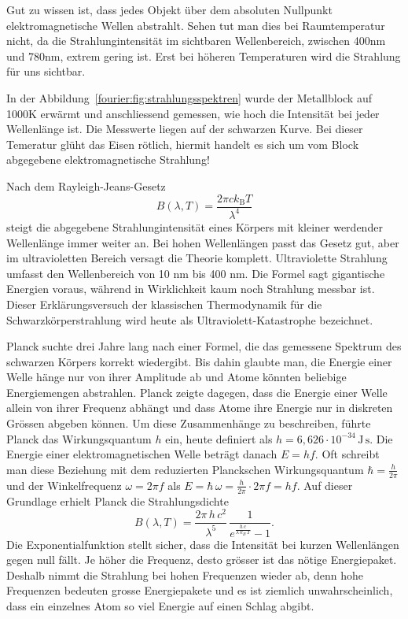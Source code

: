 Gut zu wissen ist, dass jedes Objekt über dem absoluten Nullpunkt elektromagnetische Wellen abstrahlt. 
Sehen tut man dies bei Raumtemperatur nicht, da die Strahlungintensität im sichtbaren Wellenbereich, zwischen 400nm und 780nm, extrem gering ist. 
Erst bei höheren Temperaturen wird die Strahlung für uns sichtbar. 



In der Abbildung~\ref{fourier:fig:strahlungsspektren} wurde der Metallblock auf 1000K erwärmt und anschliessend gemessen, wie hoch die Intensität bei jeder Wellenlänge ist. 
Die Messwerte liegen auf der schwarzen Kurve.
Bei dieser Temeratur glüht das Eisen rötlich, hiermit handelt es sich um vom Block abgegebene elektromagnetische Strahlung!


Nach dem Rayleigh-Jeans-Gesetz 
%
\begin{equation}
	B(\lambda, T) = \frac{2 \pi c k_\mathrm{B} T}{\lambda^4}
\end{equation}
steigt die abgegebene Strahlungintensität eines Körpers mit kleiner werdender Wellenlänge immer weiter an. 
Bei hohen Wellenlängen passt das Gesetz gut, aber im ultravioletten Bereich versagt die Theorie komplett. Ultraviolette Strahlung umfasst den Wellenbereich von 10 nm bis 400 nm. 
Die Formel sagt gigantische Energien voraus, während in Wirklichkeit kaum noch Strahlung messbar ist. 
Dieser Erklärungsversuch der klassischen Thermodynamik für die Schwarzkörperstrahlung wird heute als Ultraviolett-Katastrophe bezeichnet. 
%



Planck suchte drei Jahre lang nach einer Formel, die das gemessene Spektrum des schwarzen Körpers korrekt wiedergibt.  
Bis dahin glaubte man, die Energie einer Welle hänge nur von ihrer Amplitude ab und Atome könnten beliebige Energiemengen abstrahlen.  
Planck zeigte dagegen, dass die Energie einer Welle allein von ihrer Frequenz abhängt und dass Atome ihre Energie nur in diskreten Grössen abgeben können.  
Um diese Zusammenhänge zu beschreiben, führte Planck das Wirkungsquantum $h$ ein, heute definiert als  
%
$
h = 6{,}626\cdot10^{-34}\,\mathrm{J\,s}.
$
Die Energie einer elektromagnetischen Welle beträgt danach $E = hf$.  
Oft schreibt man diese Beziehung mit dem reduzierten Planckschen Wirkungsquantum $\hbar = \tfrac{h}{2\pi}$ und der Winkelfrequenz $\omega = 2\pi f$ als  
$
E = \hbar\,\omega = \frac{h}{2\pi}\cdot2\pi f = h f.
$
Auf dieser Grundlage erhielt Planck die Strahlungsdichte  
%
\begin{equation}
	B(\lambda,T)
	= \frac{2\pi\,h\,c^2}{\lambda^5}\,\frac{1}{e^{\frac{h\,c}{\lambda\,k_B\,T}} - 1}.
\end{equation}
Die Exponentialfunktion stellt sicher, dass die Intensität bei kurzen Wellenlängen gegen null fällt. 
Je höher die Frequenz, desto grösser ist das nötige Energiepaket. 
Deshalb nimmt die Strahlung bei hohen Frequenzen wieder ab, denn hohe Frequenzen bedeuten grosse Energiepakete und es ist ziemlich unwahrscheinlich, dass ein einzelnes Atom so viel Energie auf einen Schlag abgibt. 


